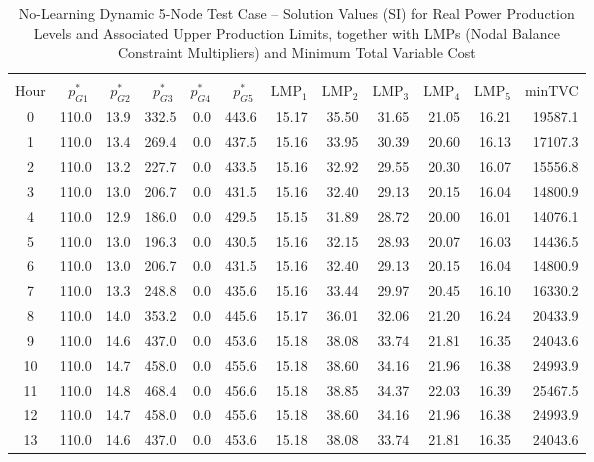 \documentclass[12pt]{article}
\begin{document}
\begin{table}[h]
	\caption{No-Learning Dynamic 5-Node Test Case -- Solution Values (SI) for Real Power Production Levels 
and Associated Upper Production Limits, together with LMPs (Nodal Balance Constraint Multipliers) and Minimum Total Variable Cost} 
	\label{tab: 5Node.NoLearning.ProdsLMPsMinTVC}
\begin{minipage}{\textwidth}
	\centering
\begin{tabular}{crrrrrrrrrrr} 
\hline\hline \\[0.1ex]
Hour & $p_{G1}^\ast~$ & $p_{G2}^\ast$ & $p_{G3}^\ast~$ &  $p_{G4}^\ast$ & $p_{G5}^\ast~$ 
& $\mbox{LMP}_1$ & $\mbox{LMP}_2$ & $\mbox{LMP}_3$ & $\mbox{LMP}_4$ & $\mbox{LMP}_5$  & minTVC \\
\hline
0	&	110.0	&	13.9	&	332.5	&	0.0	&	443.6	&	15.17	&	35.50	&	31.65	&	21.05	&	16.21	&	19587.1	\\
1	&	110.0	&	13.4	&	269.4	&	0.0	&	437.5	&	15.16	&	33.95	&	30.39	&	20.60	&	16.13	&	17107.3	\\
2	&	110.0	&	13.2	&	227.7	&	0.0	&	433.5	&	15.16	&	32.92	&	29.55	&	20.30	&	16.07	&	15556.8	\\
3	&	110.0	&	13.0	&	206.7	&	0.0	&	431.5	&	15.16	&	32.40	&	29.13	&	20.15	&	16.04	&	14800.9	\\
4	&	110.0	&	12.9	&	186.0	&	0.0	&	429.5	&	15.15	&	31.89	&	28.72	&	20.00	&	16.01	&	14076.1	\\
5	&	110.0	&	13.0	&	196.3	&	0.0	&	430.5	&	15.16	&	32.15	&	28.93	&	20.07	&	16.03	&	14436.5	\\
6	&	110.0	&	13.0	&	206.7	&	0.0	&	431.5	&	15.16	&	32.40	&	29.13	&	20.15	&	16.04	&	14800.9	\\
7	&	110.0	&	13.3	&	248.8	&	0.0	&	435.6	&	15.16	&	33.44	&	29.97	&	20.45	&	16.10	&	16330.2	\\
8	&	110.0	&	14.0	&	353.2	&	0.0	&	445.6	&	15.17	&	36.01	&	32.06	&	21.20	&	16.24	&	20433.9	\\
9	&	110.0	&	14.6	&	437.0	&	0.0	&	453.6	&	15.18	&	38.08	&	33.74	&	21.81	&	16.35	&	24043.6	\\
10	&	110.0	&	14.7	&	458.0	&	0.0	&	455.6	&	15.18	&	38.60	&	34.16	&	21.96	&	16.38	&	24993.9	\\
11	&	110.0	&	14.8	&	468.4	&	0.0	&	456.6	&	15.18	&	38.85	&	34.37	&	22.03	&	16.39	&	25467.5	\\
12	&	110.0	&	14.7	&	458.0	&	0.0	&	455.6	&	15.18	&	38.60	&	34.16	&	21.96	&	16.38	&	24993.9	\\
13	&	110.0	&	14.6	&	437.0	&	0.0	&	453.6	&	15.18	&	38.08	&	33.74	&	21.81	&	16.35	&	24043.6	\\

\end{tabular}
\end{minipage}
\end{table}
\end{document}
